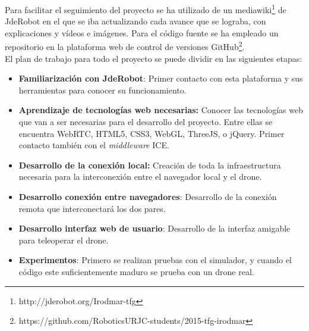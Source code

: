 Para facilitar el seguimiento del proyecto se ha utilizado de un mediawiki\footnote{http://jderobot.org/Irodmar-tfg} de JdeRobot en el que se iba actualizando cada avance que se lograba, con explicaciones y vídeos e imágenes. Para el código fuente se ha empleado un repositorio en la plataforma web de control de versiones GitHub\footnote{https://github.com/RoboticsURJC-students/2015-tfg-irodmar}.\\

El plan de trabajo para todo el proyecto se puede dividir en las siguientes etapas:

\begin{itemize}
\item \textbf{Familiarización con JdeRobot}: Primer contacto con esta plataforma y sus herramientas para conocer su funcionamiento.
\item \textbf{Aprendizaje de tecnologías web necesarias:} Conocer las tecnologías web que van a ser necesarias para el desarrollo del proyecto. Entre ellas se encuentra WebRTC, HTML5, CSS3, WebGL, ThreeJS, o jQuery. Primer contacto también con el \emph{middleware} ICE.
\item \textbf{Desarrollo de la conexión local:} Creación de toda la infraestructura necesaria para la interconexión entre el navegador local y el drone.
\item \textbf{Desarrollo conexión entre navegadores}: Desarrollo de la conexión remota que interconectará los dos pares.
\item \textbf{Desarrollo interfaz web de usuario}: Desarrollo de la interfaz amigable para teleoperar el drone.
\item \textbf{Experimentos}: Primero se realizan pruebas con el simulador, y cuando el código este suficientemente maduro se prueba con un drone real.
\end{itemize}






